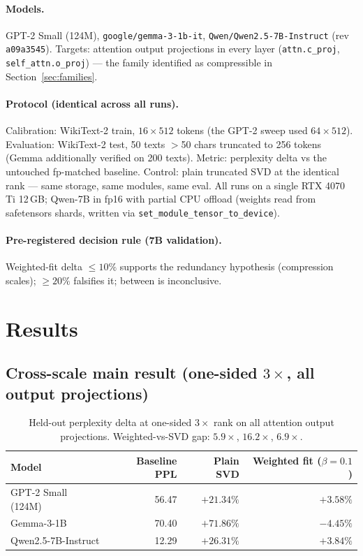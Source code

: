 \documentclass[11pt]{article}
\begin{document}
\paragraph{Models.} GPT-2 Small (124M), \texttt{google/gemma-3-1b-it},
\texttt{Qwen/Qwen2.5-7B-Instruct} (rev \texttt{a09a3545}). Targets:
attention output projections in every layer (\texttt{attn.c\_proj},
\texttt{self\_attn.o\_proj}) --- the family identified as compressible in
Section~\ref{sec:families}.

\paragraph{Protocol (identical across all runs).} Calibration: WikiText-2
train, $16\times512$ tokens (the GPT-2 sweep used $64\times512$).
Evaluation: WikiText-2 test, 50 texts $>$50 chars truncated to 256 tokens
(Gemma additionally verified on 200 texts). Metric: perplexity delta vs the
untouched fp-matched baseline. Control: plain truncated SVD at the
identical rank --- same storage, same modules, same eval. All runs on a
single RTX 4070 Ti 12\,GB; Qwen-7B in fp16 with partial CPU offload
(weights read from safetensors shards, written via
\texttt{set\_module\_tensor\_to\_device}).

\paragraph{Pre-registered decision rule (7B validation).} Weighted-fit
delta $\le 10\%$ supports the redundancy hypothesis (compression scales);
$\ge 20\%$ falsifies it; between is inconclusive.

\section{Results}\label{sec:results}

\subsection{Cross-scale main result (one-sided $3\times$, all output projections)}

\begin{table}[h]
\centering
\begin{tabular}{lrrr}
\toprule
Model & Baseline PPL & Plain SVD & Weighted fit ($\beta=0.1$) \\
\midrule
GPT-2 Small (124M)      & 56.47 & $+21.34\%$ & $\mathbf{+3.58\%}$ \\
Gemma-3-1B              & 70.40 & $+71.86\%$ & $\mathbf{-4.45\%}$ \\
Qwen2.5-7B-Instruct     & 12.29 & $+26.31\%$ & $\mathbf{+3.84\%}$ \\
\bottomrule
\end{tabular}
\caption{Held-out perplexity delta at one-sided $3\times$ rank on all
attention output projections. Weighted-vs-SVD gap: $5.9\times$,
$16.2\times$, $6.9\times$.}
\label{tab:main}
\end{table}
\end{document}
